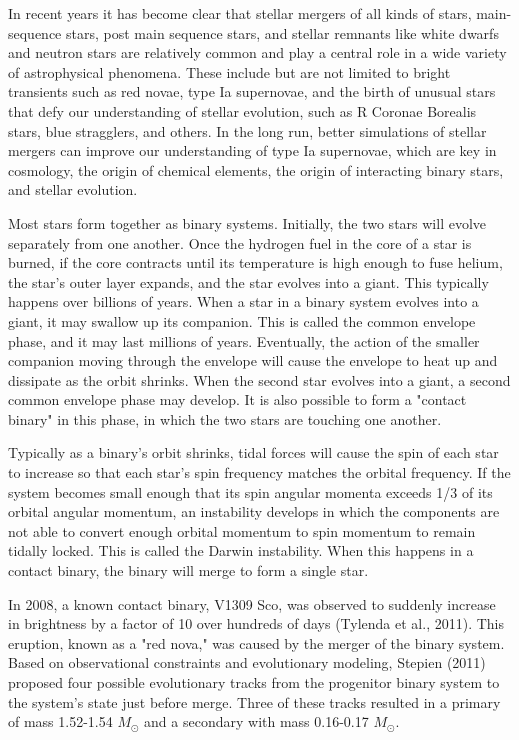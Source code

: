 \documentclass{article}
\begin{document}
In recent years it has become clear that stellar mergers of all kinds of stars, main-sequence stars, post main sequence stars, and stellar remnants like white dwarfs and neutron stars are relatively common and play a central role in a wide variety of astrophysical phenomena. These include but are not limited to bright transients such as red novae, type Ia supernovae, and the birth of unusual stars that defy our understanding of stellar evolution, such as R Coronae Borealis stars, blue stragglers, and others. In the long run, better simulations of stellar mergers can improve our understanding of type Ia supernovae, which are key in cosmology, the origin of chemical elements, the origin of interacting binary stars, and stellar evolution.

Most stars form together as binary systems. Initially, the two stars will evolve separately from one another. Once the hydrogen fuel in the core of a star is burned, if the core contracts until its temperature is high enough to fuse helium, the star's outer layer expands, and the star evolves into a giant. This typically happens over billions of years. When a star in a binary system evolves into a giant, it may swallow up its companion. This is called the common envelope phase, and it may last millions of years. Eventually, the action of the smaller companion moving through the envelope will cause the envelope to heat up and dissipate as the orbit shrinks. When the second star evolves into a giant, a second common envelope phase may develop. It is also possible to form a "contact binary" in this phase, in which the two stars are touching one another. 

Typically as a binary's orbit shrinks, tidal forces will cause the spin of each star to increase so that each star's spin frequency matches the orbital frequency. If the system becomes small enough that its spin angular momenta exceeds 1/3 of its orbital angular momentum, an instability develops in which the components are not able to convert enough orbital momentum to spin momentum to remain tidally locked. This is called the Darwin instability. When this happens in a contact binary, the binary will merge to form a single star.

In 2008, a known contact binary, V1309 Sco, was observed to suddenly increase in brightness by a factor of 10 over hundreds of days (Tylenda et al., 2011). This eruption, known as a "red nova," was caused by the merger of the binary system. Based on observational constraints and evolutionary modeling, Stepien (2011) proposed four possible evolutionary tracks from the progenitor binary system to the system's state just before merge. Three of these tracks resulted in a primary of mass 1.52-1.54 $M_\odot$  and a secondary with mass 0.16-0.17 $M_\odot$.
\end{document}

